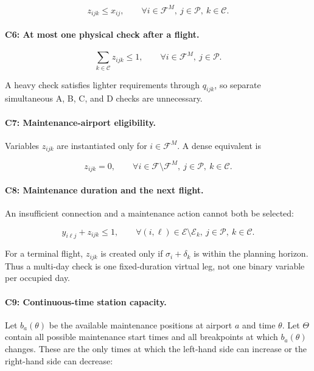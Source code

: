 \documentclass[11pt,a4paper]{article}
\newcommand{\F}{\mathcal{F}}
\newcommand{\Pset}{\mathcal{P}}
\newcommand{\Cset}{\mathcal{C}}
\newcommand{\Eset}{\mathcal{E}}
\begin{document}
\begin{equation}
  z_{ijk}\leq x_{ij},
  \qquad \forall i\in\F^M,\ j\in\Pset,\ k\in\Cset.
  \tag{C5}\label{eq:event_c5}
\end{equation}

\paragraph{C6: At most one physical check after a flight.}

\begin{equation}
  \sum_{k\in\Cset}z_{ijk}\leq1,
  \qquad \forall i\in\F^M,\ j\in\Pset.
  \tag{C6}\label{eq:event_c6}
\end{equation}

A heavy check satisfies lighter requirements through $q_{ijk}$, so separate
simultaneous A, B, C, and D checks are unnecessary.

\paragraph{C7: Maintenance-airport eligibility.}
Variables $z_{ijk}$ are instantiated only for $i\in\F^M$. A dense equivalent
is

\begin{equation}
  z_{ijk}=0,
  \qquad \forall i\in\F\setminus\F^M,\ j\in\Pset,\ k\in\Cset.
  \tag{C7}\label{eq:event_c7}
\end{equation}

\paragraph{C8: Maintenance duration and the next flight.}
An insufficient connection and a maintenance action cannot both be selected:

\begin{equation}
  y_{i\ell j}+z_{ijk}\leq1,
  \qquad
  \forall(i,\ell)\in\Eset\setminus\Eset_k,\ j\in\Pset,\ k\in\Cset.
  \tag{C8}\label{eq:event_c8}
\end{equation}

For a terminal flight, $z_{ijk}$ is created only if
$\sigma_i+\delta_k$ is within the planning horizon. Thus a multi-day check is
one fixed-duration virtual leg, not one binary variable per occupied day.

\paragraph{C9: Continuous-time station capacity.}
Let $b_a(\theta)$ be the available maintenance positions at airport $a$ and
time $\theta$. Let $\Theta$ contain all possible maintenance start times and
all breakpoints at which $b_a(\theta)$ changes. These are the only times at
which the left-hand side can increase or the right-hand side can decrease:
\end{document}
